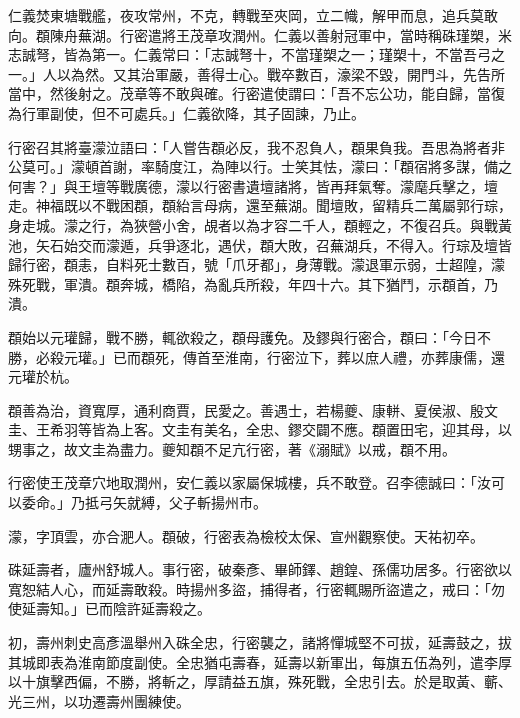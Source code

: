 \begin{pinyinscope}
 仁義焚東塘戰艦，夜攻常州，不克，轉戰至夾岡，立二幟，解甲而息，追兵莫敢向。頵陳舟蕪湖。行密遣將王茂章攻潤州。仁義以善射冠軍中，當時稱硃瑾槊，米志誠弩，皆為第一。仁義常曰：「志誠弩十，不當瑾槊之一；瑾槊十，不當吾弓之一。」人以為然。又其治軍嚴，善得士心。戰卒數百，濠梁不毀，開門斗，先告所當中，然後射之。茂章等不敢與確。行密遣使謂曰：「吾不忘公功，能自歸，當復為行軍副使，但不可處兵。」仁義欲降，其子固諫，乃止。



 行密召其將臺濛泣語曰：「人嘗告頵必反，我不忍負人，頵果負我。吾思為將者非公莫可。」濛頓首謝，率騎度江，為陣以行。士笑其怯，濛曰：「頵宿將多謀，備之何害？」與王壇等戰廣德，濛以行密書遺壇諸將，皆再拜氣奪。濛麾兵擊之，壇走。神福既以不戰困頵，頵紿言母病，還至蕪湖。聞壇敗，留精兵二萬屬郭行琮，身走城。濛之行，為狹營小舍，覘者以為才容二千人，頵輕之，不復召兵。與戰黃池，矢石始交而濛遁，兵爭逐北，遇伏，頵大敗，召蕪湖兵，不得入。行琮及壇皆歸行密，頵恚，自料死士數百，號「爪牙都」，身薄戰。濛退軍示弱，士超隍，濛殊死戰，軍潰。頵奔城，橋陷，為亂兵所殺，年四十六。其下猶鬥，示頵首，乃潰。



 頵始以元瓘歸，戰不勝，輒欲殺之，頵母護免。及鏐與行密合，頵曰：「今日不勝，必殺元瓘。」已而頵死，傳首至淮南，行密泣下，葬以庶人禮，亦葬康儒，還元瓘於杭。



 頵善為治，資寬厚，通利商賈，民愛之。善遇士，若楊夔、康軿、夏侯淑、殷文圭、王希羽等皆為上客。文圭有美名，全忠、鏐交闢不應。頵置田宅，迎其母，以甥事之，故文圭為盡力。夔知頵不足亢行密，著《溺賦》以戒，頵不用。



 行密使王茂章穴地取潤州，安仁義以家屬保城樓，兵不敢登。召李德誠曰：「汝可以委命。」乃抵弓矢就縛，父子斬揚州市。



 濛，字頂雲，亦合淝人。頵破，行密表為檢校太保、宣州觀察使。天祐初卒。



 硃延壽者，廬州舒城人。事行密，破秦彥、畢師鐸、趙鍠、孫儒功居多。行密欲以寬恕結人心，而延壽敢殺。時揚州多盜，捕得者，行密輒賜所盜遣之，戒曰：「勿使延壽知。」已而陰許延壽殺之。



 初，壽州刺史高彥溫舉州入硃全忠，行密襲之，諸將憚城堅不可拔，延壽鼓之，拔其城即表為淮南節度副使。全忠猶屯壽春，延壽以新軍出，每旗五伍為列，遣李厚以十旗擊西偏，不勝，將斬之，厚請益五旗，殊死戰，全忠引去。於是取黃、蘄、光三州，以功遷壽州團練使。




\end{pinyinscope}
